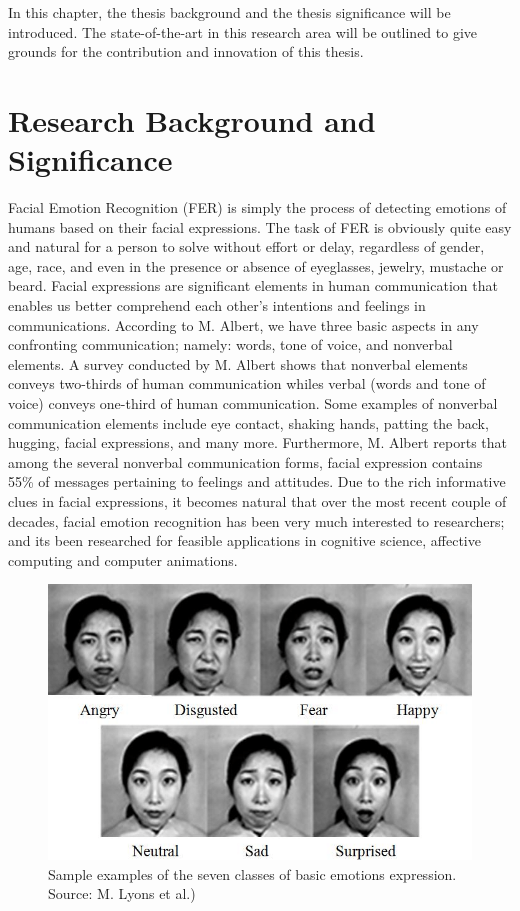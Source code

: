 \documentclass[master]{thesis-uestc}
\begin{document}
In this chapter, the thesis background and the thesis significance will be introduced. The state-of-the-art in this research area will be outlined to give grounds for the contribution and innovation of this thesis. 

\section{Research Background and Significance}
Facial Emotion Recognition (FER) is simply the process of detecting emotions of humans based on their facial expressions. The task of FER is obviously quite easy and natural for a person to solve without effort or delay, regardless of gender, age, race, and even in the presence or absence of eyeglasses, jewelry, mustache or beard. Facial expressions are significant elements in human communication that enables us better comprehend each other's intentions and feelings in communications. According to M. Albert, we have three basic aspects in any confronting communication; namely: words, tone of voice, and nonverbal elements. A survey conducted by M. Albert shows that nonverbal elements conveys two-thirds of human communication whiles verbal (words and tone of voice) conveys one-third of human communication. Some examples of nonverbal communication elements include eye contact, shaking hands, patting the back, hugging, facial expressions, and many more. Furthermore, M. Albert reports that among the several nonverbal communication forms, facial expression contains 55\% of messages pertaining to feelings and attitudes. Due to the rich informative clues in facial expressions, it becomes natural that over the most recent couple of decades, facial emotion recognition has been very much interested to researchers; and its been researched for feasible applications in cognitive science, affective computing and computer animations.

\begin{figure}[ht]
\includegraphics[width=5in]{pic/7_basic_emotions.png}
\caption{Sample examples of the seven classes of basic emotions expression. Source: M. Lyons et al.)}
\label{7_basic_emotions}
\end{figure}
\end{document}
